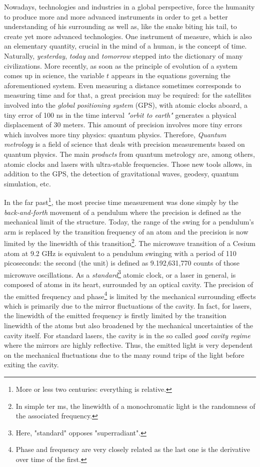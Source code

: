 \documentclass[11pt]{report}
\begin{document}
Nowadays, technologies and industries in a global perspective, force the humanity to produce more and more advanced instruments in order to get a better understanding of his surrounding as well as, like the snake biting his tail, to create yet more advanced technologies. One instrument of measure, which is also an elementary quantity, crucial in the mind of a human, is the concept of time. Naturally, \textit{yesterday}, \textit{today} and \textit{tomorrow} stepped into the dictionary of many civilizations. More recently, as soon as the principle of evolution of a system comes up in science, the variable $t$ appears in the equations governing the aforementioned system. Even measuring a distance sometimes corresponds to measuring time and for that, a great precision may be required: for the satellites involved into the \textit{global positioning system} (GPS), with atomic clocks aboard, a tiny error of 100 ns in the time interval \textit{"orbit to earth"} generates a physical displacement of 30 meters. This amount of precision involves more tiny errors which involves more tiny physics: quantum physics. Therefore, \textit{Quantum metrology} is a field of science that deals with precision measurements based on quantum physics. The main \textit{products} from quantum metrology are, among others, atomic clocks and lasers with ultra-stable frequencies. Those new tools allows, in addition to the GPS, the detection of gravitational waves, geodesy, quantum simulation, etc. 

In the far past\footnote{More or less two centuries: everything is relative.}, the most precise time measurement was done simply by the \textit{back-and-forth} movement of a pendulum where the precision is defined as the mechanical limit of the structure. Today, the range of the swing for a pendulum's arm is replaced by the transition frequency of an atom and the precision is now limited by the linewidth of this transition\footnote{In simple ter ms, the linewidth of a monochromatic light is the randomness of the associated frequency.}. The microwave transition of a Cesium atom at 9.2 GHz is equivalent to a pendulum swinging with a period of 110 picoseconds: the second (the unit) is defined as 9.192,631,770 counts of those microwave oscillations. As a \textit{standard}\footnote{Here, "standard" opposes "superradiant".} atomic clock, or a laser in general, is composed of atoms in its heart, surrounded by an optical cavity. The precision of the emitted frequency and phase\footnote{Phase and frequency are very closely related as the last one is the derivative over time of the first.} is limited by the mechanical surrounding effects which is primarily due to the mirror fluctuations of the cavity. In fact, for lasers, the linewidth of the emitted frequency is firstly limited by the transition linewidth of the atoms but also broadened by the mechanical uncertainties of the cavity itself. For standard lasers, the cavity is in the so called \textit{good cavity regime} where the mirrors are highly reflective. Thus, the emitted light is very dependent on the mechanical fluctuations due to the many round trips of the light before exiting the cavity. 
\end{document}
